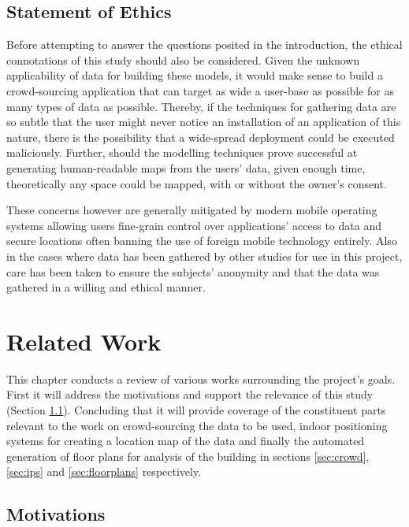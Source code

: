 \documentclass{UoYCSproject}
\begin{document}
        \section*{Statement of Ethics}
                    
            Before attempting to answer the questions posited in the introduction, the ethical connotations of this study should also be considered. Given the unknown applicability of data for building these models, it would make sense to build a crowd-sourcing application that can target as wide a user-base as possible for as many types of data as possible. Thereby, if the techniques for gathering data are so subtle that the user might never notice an installation of an application of this nature, there is the possibility that a wide-spread deployment could be executed maliciously. Further, should the modelling techniques prove successful at generating human-readable maps from the users' data, given enough time, theoretically any space could be mapped, with or without the owner's consent.
            
            These concerns however are generally mitigated by modern mobile operating systems allowing users fine-grain control over applications' access to data and secure locations often banning the use of foreign mobile technology entirely. Also in the cases where data has been gathered by other studies for use in this project, care has been taken to ensure the subjects' anonymity and that the data was gathered in a willing and ethical manner.
        
	\chapter{Related Work}
    \label{chap:related}
	
		This chapter conducts a review of various works surrounding the project's goals. First it will address the motivations and support the relevance of this study (Section \ref{sec:motivations}). Concluding that it will provide coverage of the constituent parts relevant to the work on crowd-sourcing the data to be used, indoor positioning systems for creating a location map of the data and finally the automated generation of floor plans for analysis of the building in sections \ref{sec:crowd}, \ref{sec:ips} and \ref{sec:floorplans} respectively.
        
        \section{Motivations}
        \label{sec:motivations}
        
\end{document}
